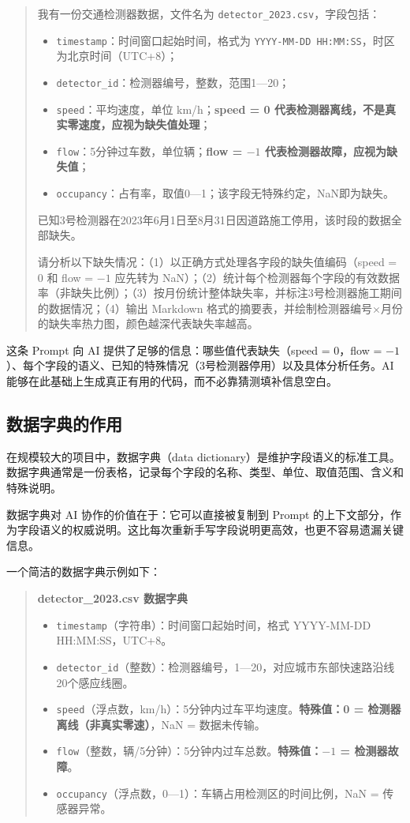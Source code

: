 \begin{quote}
我有一份交通检测器数据，文件名为 \texttt{detector\_2023.csv}，字段包括：
\begin{itemize}
  \item \texttt{timestamp}：时间窗口起始时间，格式为 \texttt{YYYY-MM-DD HH:MM:SS}，时区为北京时间（UTC+8）；
  \item \texttt{detector\_id}：检测器编号，整数，范围1—20；
  \item \texttt{speed}：平均速度，单位 km/h；\textbf{speed = 0 代表检测器离线，不是真实零速度，应视为缺失值处理}；
  \item \texttt{flow}：5分钟过车数，单位辆；\textbf{flow = $-1$ 代表检测器故障，应视为缺失值}；
  \item \texttt{occupancy}：占有率，取值0—1；该字段无特殊约定，NaN即为缺失。
\end{itemize}
已知3号检测器在2023年6月1日至8月31日因道路施工停用，该时段的数据全部缺失。

请分析以下缺失情况：（1）以正确方式处理各字段的缺失值编码（speed = 0 和 flow = $-1$ 应先转为 NaN）；（2）统计每个检测器每个字段的有效数据率（非缺失比例）；（3）按月份统计整体缺失率，并标注3号检测器施工期间的数据情况；（4）输出 Markdown 格式的摘要表，并绘制检测器编号×月份的缺失率热力图，颜色越深代表缺失率越高。
\end{quote}

这条 Prompt 向 AI 提供了足够的信息：哪些值代表缺失（speed = 0，flow = $-1$）、每个字段的语义、已知的特殊情况（3号检测器停用）以及具体分析任务。AI 能够在此基础上生成真正有用的代码，而不必靠猜测填补信息空白。

\subsection{数据字典的作用}

在规模较大的项目中，数据字典（data dictionary）是维护字段语义的标准工具。数据字典通常是一份表格，记录每个字段的名称、类型、单位、取值范围、含义和特殊说明。

数据字典对 AI 协作的价值在于：它可以直接被复制到 Prompt 的上下文部分，作为字段语义的权威说明。这比每次重新手写字段说明更高效，也更不容易遗漏关键信息。

一个简洁的数据字典示例如下：

\begin{quote}
\textbf{detector\_2023.csv 数据字典}

\begin{itemize}
  \item \texttt{timestamp}（字符串）：时间窗口起始时间，格式 YYYY-MM-DD HH:MM:SS，UTC+8。
  \item \texttt{detector\_id}（整数）：检测器编号，1—20，对应城市东部快速路沿线20个感应线圈。
  \item \texttt{speed}（浮点数，km/h）：5分钟内过车平均速度。\textbf{特殊值：0 = 检测器离线（非真实零速）}，NaN = 数据未传输。
  \item \texttt{flow}（整数，辆/5分钟）：5分钟内过车总数。\textbf{特殊值：$-1$ = 检测器故障}。
  \item \texttt{occupancy}（浮点数，0—1）：车辆占用检测区的时间比例，NaN = 传感器异常。
\end{itemize}
\end{quote}

